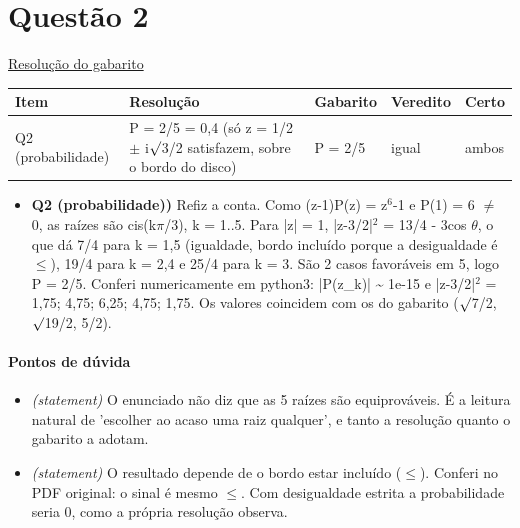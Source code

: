 \documentclass{article}%
\begin{document}
\section*{Questão 2}%
\href{https://poliedroresolve.sistemapoliedro.com.br/vestibulares/ime/2027/ime-2-fase-dia-1-26-10-2026-2-fase-dia-1/dissertativa-2-matematica-2-fase-dia-1-ime-2027}{Resolução do gabarito}\par\smallskip%
\begin{longtable}{@{}p{} p{} p{} p{} p{}@{}}\toprule Item & Resolução & Gabarito & Veredito & Certo \\ \midrule
Q2 (probabilidade) & P = 2/5 = 0,4 (só z = 1/2 $\pm$ i$\surd$3/2 satisfazem, sobre o bordo do disco) & P = 2/5 & igual & ambos \\
\bottomrule\end{longtable}%
\begin{itemize}%
\item%
\textbf{Q2 (probabilidade))} Refiz a conta. Como (z-1)P(z) = z$^{6}$-1 e P(1) = 6 $\neq$ 0, as raízes são cis(k$\pi$/3), k = 1..5. Para |z| = 1, |z-3/2|$^2$ = 13/4 - 3cos $\theta$, o que dá 7/4 para k = 1,5 (igualdade, bordo incluído porque a desigualdade é $\leq$), 19/4 para k = 2,4 e 25/4 para k = 3. São 2 casos favoráveis em 5, logo P = 2/5. Conferi numericamente em python3: |P(z\_k)| \textasciitilde{} 1e{-}15 e |z-3/2|$^2$ = 1,75; 4,75; 6,25; 4,75; 1,75. Os valores coincidem com os do gabarito ($\surd$7/2, $\surd$19/2, 5/2).%
\end{itemize}%
\paragraph{Pontos de dúvida}%
\begin{itemize}%
\item%
\textit{(statement)} O enunciado não diz que as 5 raízes são equiprováveis. É a leitura natural de 'escolher ao acaso uma raiz qualquer', e tanto a resolução quanto o gabarito a adotam.%
\item%
\textit{(statement)} O resultado depende de o bordo estar incluído ($\leq$). Conferi no PDF original: o sinal é mesmo $\leq$. Com desigualdade estrita a probabilidade seria 0, como a própria resolução observa.%
\end{itemize}%
\end{document}
